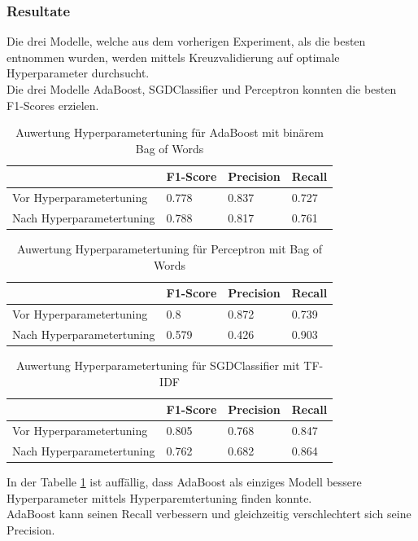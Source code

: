 \subsubsection{Resultate}
Die drei Modelle, welche aus dem vorherigen Experiment, als die besten entnommen wurden, werden mittels Kreuzvalidierung auf optimale Hyperparameter durchsucht.\\
Die drei Modelle AdaBoost, SGDClassifier und Perceptron konnten die besten F1-Scores erzielen.\\
\begin{table}[H]
	\caption{Auwertung Hyperparametertuning für AdaBoost mit binärem Bag of Words}
	\centering
	\label{tab:ada}
	\begin{tabular}{|l|l|l|l|}
		\hline
		& F1-Score & Precision & Recall\\
		\hline
		Vor Hyperparametertuning & 0.778 & 0.837 & 0.727 \\
		Nach Hyperparametertuning & 0.788 & 0.817 & 0.761 \\
		\hline
	\end{tabular}
\end{table}
\begin{table}[H]
	\caption{Auwertung Hyperparametertuning für Perceptron mit Bag of Words}
	\centering
	\label{tab:per}
	\begin{tabular}{|l|l|l|l|}
		\hline
		& F1-Score & Precision & Recall\\
		\hline
		Vor Hyperparametertuning & 0.8 & 0.872 & 0.739 \\
		Nach Hyperparametertuning & 0.579 & 0.426 & 0.903 \\
		\hline
	\end{tabular}
\end{table}
\begin{table}[H]
	\caption{Auwertung Hyperparametertuning für SGDClassifier mit TF-IDF}
	\centering
	\label{tab:sgd}
	\begin{tabular}{|l|l|l|l|}
		\hline
		& F1-Score & Precision & Recall\\
		\hline
		Vor Hyperparametertuning & 0.805 & 0.768 & 0.847 \\
		Nach Hyperparametertuning & 0.762 & 0.682 & 0.864 \\
		\hline
	\end{tabular}
\end{table}
In der Tabelle \cref{tab:ada} ist auffällig, dass AdaBoost als einziges Modell bessere Hyperparameter mittels Hyperparemtertuning finden konnte.\\
AdaBoost kann seinen Recall verbessern und gleichzeitig verschlechtert sich seine Precision.
